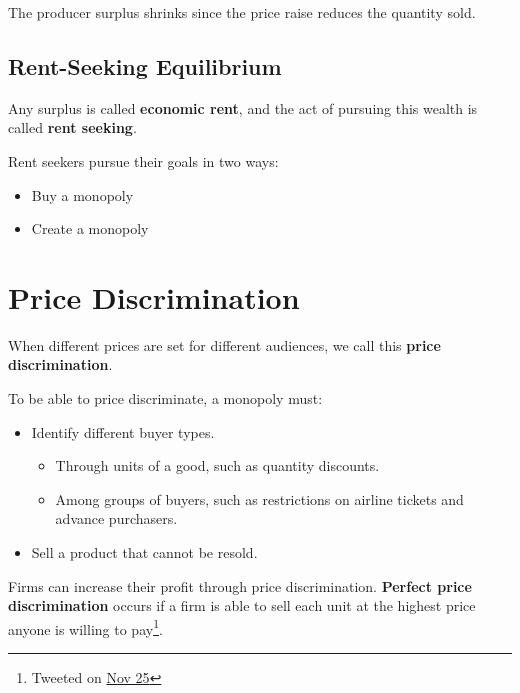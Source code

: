                    The producer surplus shrinks since the price raise reduces the quantity sold.
                \subsection{Rent-Seeking Equilibrium} %
                \label{sub:rent_seeking_equilibrium}
                    Any surplus is called \textbf{economic rent}, and the act of pursuing this wealth is called \textbf{rent seeking}.

                    Rent seekers pursue their goals in two ways:
                    \begin{itemize}
                        \item Buy a monopoly
                        \item Create a monopoly
                    \end{itemize}
            \section{Price Discrimination} %
            \label{sec:price_discrimination}
                When different prices are set for different audiences, we call this \textbf{price discrimination}.

                To be able to price discriminate, a monopoly must:
                \begin{itemize}
                    \item Identify different buyer types.
                    \begin{itemize}
                        \item Through units of a good, such as quantity discounts.
                        \item Among groups of buyers, such as restrictions on airline tickets and advance purchasers.
                    \end{itemize}
                    \item Sell a product that cannot be resold.
                \end{itemize}

                Firms can increase their profit through price discrimination.
                \textbf{Perfect price discrimination} occurs if a firm is able to sell each unit at the highest price anyone is willing to pay\footnote{Tweeted on \href{https://twitter.com/shalecraig/status/405013136597475329}{Nov 25}}.

